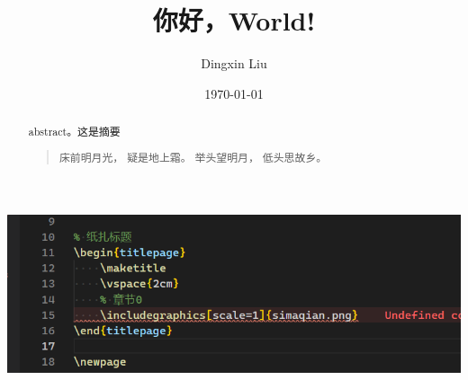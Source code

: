 \documentclass[UTF8]{ctexart}
\title{你好，World!}
\author{Dingxin Liu}
\date{\today}
\begin{document}
\begin{titlepage}
    \maketitle %
    \centering
    \includegraphics[scale=1.5]{simaqian.png}

\end{titlepage}


\newpage

\begin{abstract}
    abstract。这是摘要
    \begin{quote}
        \begin{center}
            {\kaishu
                床前明月光，\newline
                疑是地上霜。\newline
                举头望明月，\newline
                低头思故乡。\newline}
        \end{center}
    \end{quote}
\end{abstract}

\tableofcontents
\newpage
\end{document}
